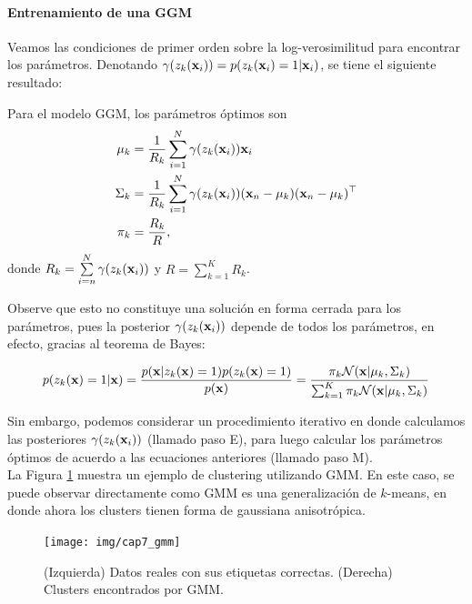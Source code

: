 \paragraph{Entrenamiento de una GGM}

Veamos las condiciones de primer orden sobre la log-verosimilitud para encontrar los parámetros. Denotando $\gamma(z_k(\mathbf{x}_i)) = p(z_k(\mathbf{x}_i)=1|\mathbf{x}_i)$, se tiene el siguiente resultado:

\begin{lemma} Para el modelo GGM, los parámetros óptimos son
	\begin{align}
    \mu_k & = \frac{1}{R_k}\sum_{i=1}^N \gamma(z_k(\mathbf{x}_i))\mathbf{x}_i\\
    \Sigma_k & = \frac{1}{R_k} \sum_{i=1}^N \gamma(z_k(\mathbf{x}_i))(\mathbf{x}_n - \mu_k)(\mathbf{x}_n - \mu_k)^\top\\
    \pi_k & = \frac{R_k}{R},
    \end{align}
    donde $R_k = \sum\limits_{i=n}^N \gamma(z_k(\mathbf{x}_i))$ y $R = \sum\limits_{k=1}^K R_k$.
\end{lemma}

Observe que esto no constituye una solución en forma cerrada para los parámetros, pues la posterior $\gamma(z_k(\mathbf{x}_i))$ depende de todos los parámetros, en efecto, gracias al teorema de Bayes:

\begin{align}
	p(z_k(\mathbf{x})=1|\mathbf{x}) = \frac{p(\mathbf{x}|z_k(\mathbf{x})=1)p(z_k(\mathbf{x})=1)}{p(\mathbf{x})} = \frac{\pi_k {\mathcal N}(\mathbf{x}|\mu_k,\Sigma_k)}{\sum_{k=1}^K \pi_k {\mathcal N}(\mathbf{x}|\mu_k,\Sigma_k)} 
\end{align} 


Sin embargo, podemos considerar un procedimiento iterativo en donde calculamos las posteriores $\gamma(z_k(\mathbf{x}_i))$ (llamado paso E), para luego calcular los parámetros óptimos de acuerdo a las ecuaciones anteriores (llamado paso M).\\

La Figura \ref{fig:gmm} muestra un ejemplo de clustering utilizando GMM. En este caso, se puede observar directamente como GMM es una generalización de $k$-means, en donde ahora los clusters tienen forma de gaussiana anisotrópica.

\begin{figure}[ht]
  \centering
  \texttt{[image: img/cap7\_gmm]}
  \caption{(Izquierda) Datos reales con sus etiquetas correctas. (Derecha) Clusters encontrados por GMM.}
  \label{fig:gmm}
\end{figure}

